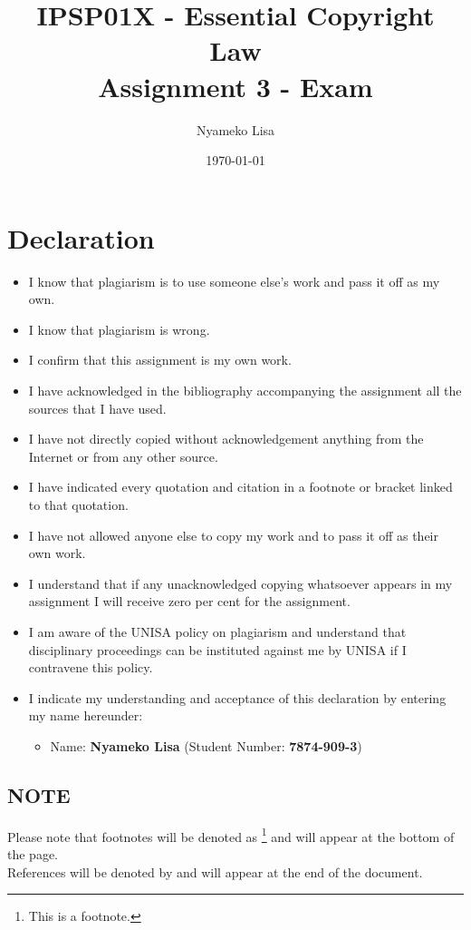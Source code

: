 \documentclass[11pt]{article}
\author{Nyameko Lisa}
\date{\today}
\title{IPSP01X - Essential Copyright Law\\\medskip
\large Assignment 3 - Exam}
\begin{document}
\maketitle
\section*{Declaration}
\label{sec:org24949bf}
\begin{itemize}
\item I know that plagiarism is to use someone else’s work and pass it off as my own.
\item I know that plagiarism is wrong.
\item I confirm that this assignment is my own work.
\item I have acknowledged in the bibliography accompanying the assignment all the sources that I have used.
\item I have not directly copied without acknowledgement anything from the Internet or from any other source.
\item I have indicated every quotation and citation in a footnote or bracket linked to that quotation.
\item I have not allowed anyone else to copy my work and to pass it off as their own work.
\item I understand that if any unacknowledged copying whatsoever appears in my assignment I will receive zero per cent for the assignment.
\item I am aware of the UNISA policy on plagiarism and understand that disciplinary proceedings can be instituted against me by UNISA if I contravene this policy.
\item I indicate my understanding and acceptance of this declaration by
entering my name hereunder:
\begin{itemize}
\item Name: \textbf{Nyameko Lisa} (Student Number: \textbf{7874-909-3})
\end{itemize}
\end{itemize}

\subsection*{NOTE}
\label{sec:org2ce93bb}
Please note that footnotes will be denoted as \footnote{This is a footnote.} and will
appear at the bottom of the page.\\
References will be denoted by \cite{rsa78_copyrightact} and will appear at the end of the document.
\newpage
\end{document}
